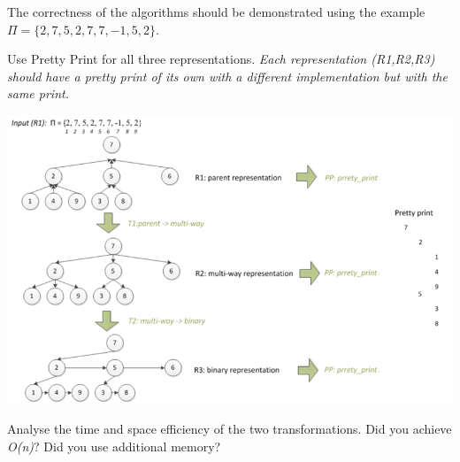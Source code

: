 \documentclass[../en-fa-lab.tex]{subfiles}
\begin{document}
The correctness of the algorithms should be demonstrated using the
example \(\Pi = \{ 2,7,5,2,7,7, - 1,5,2\}\).

Use Pretty Print for all three representations. \emph{Each
representation (R1,R2,R3) should have a pretty print of its own with a
different implementation but with the same print.}

\includegraphics[width=\textwidth]{../Resources/lab6/Lab6_representations.png}

Analyse the time and space efficiency of the two transformations. Did
you achieve \emph{O(n)}? Did you use additional memory?
\end{document}
